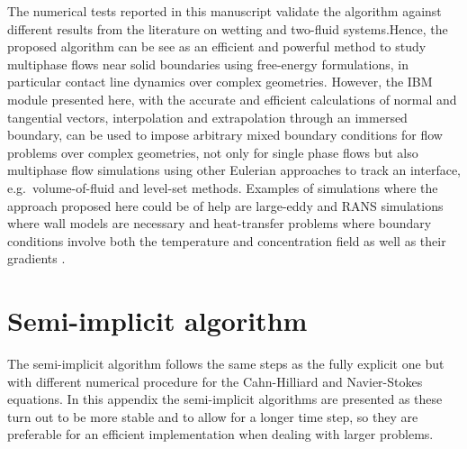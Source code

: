 \documentclass[review]{elsarticle}
\begin{document}
The numerical tests reported in this manuscript validate the algorithm against different results from the literature on wetting and two-fluid systems.Hence, the proposed algorithm can be see as an efficient and powerful method to study multiphase flows near solid boundaries using free-energy formulations, in particular contact line dynamics over complex geometries. However, the IBM module presented here, with the accurate and efficient calculations of normal and tangential vectors, interpolation and extrapolation through an immersed boundary, can be used to impose arbitrary mixed boundary conditions for flow problems over complex geometries, not only for single phase flows but also multiphase flow simulations using  other Eulerian approaches to track an interface, e.g.\ volume-of-fluid and level-set methods. 
Examples of simulations where the approach proposed here could be of help are large-eddy and RANS simulations where wall models are necessary \citep{Roman,Amitabh} and heat-transfer problems where boundary conditions involve both the temperature and concentration field as well as their gradients \citep{LUPO2019118563}.

\appendix \label{Appendix}
\section{ Semi-implicit algorithm}
The semi-implicit algorithm follows the same steps as the fully explicit one but with different numerical procedure for  the Cahn-Hilliard and Navier-Stokes equations. In this appendix the semi-implicit algorithms are presented as these turn out to be more stable and  to allow for a longer time step, so they are preferable for an efficient implementation when dealing with larger problems.
\end{document}
